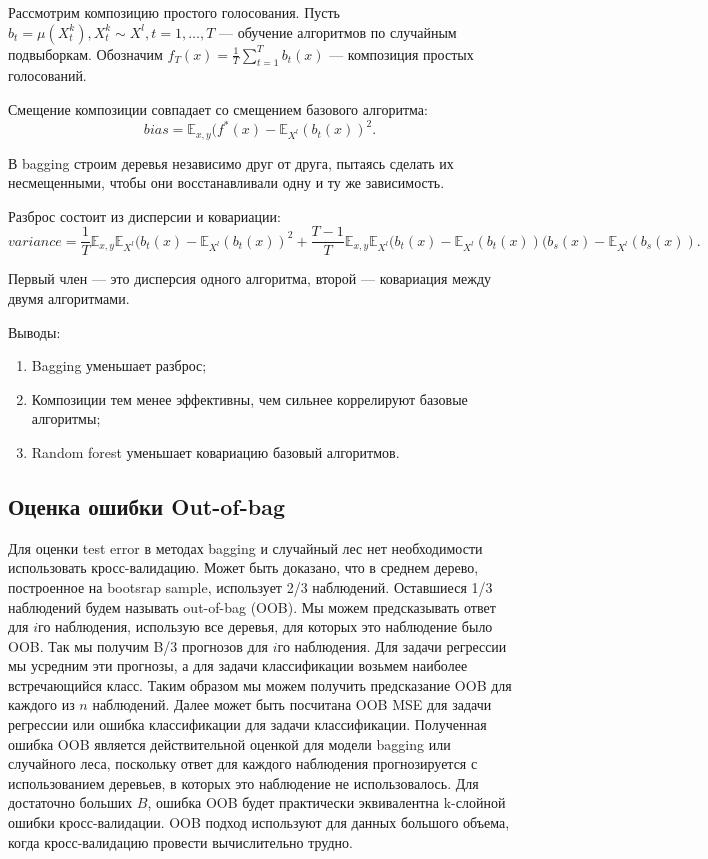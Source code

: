 \documentclass[14pt, a4paper]{article}
\begin{document}
Рассмотрим композицию простого голосования. Пусть $b_t = \mu(X_t^k), X_t^k \sim X^l, t = 1, \ldots, T$ --- обучение алгоритмов по случайным подвыборкам. Обозначим $f_T(x) = \frac{1}{T}\sum_{t=1}^T b_t(x)$ --- композиция простых голосований.

Смещение композиции совпадает со смещением базового алгоритма:
\begin{equation*}
bias = \mathbb{E}_{x,y} (f^{*}(x) -  \mathbb{E}_{X^l}(b_t(x))^2.
\end{equation*}

В bagging строим деревья независимо друг от друга, пытаясь сделать их несмещенными, чтобы они восстанавливали одну и ту же зависимость.

Разброс состоит из дисперсии и ковариации:
\begin{equation*}
variance = \frac{1}{T}\mathbb{E}_{x,y}\mathbb{E}_{X^l}(b_t(x) - \mathbb{E}_{X^l}(b_t(x))^2 + \frac{T-1}{T} \mathbb{E}_{x,y}\mathbb{E}_{X^l}(b_t(x) - \mathbb{E}_{X^l}(b_t(x))(b_s(x) - \mathbb{E}_{X^l}(b_s(x)).
\end{equation*}

Первый член --- это дисперсия одного алгоритма, второй --- ковариация между двумя алгоритмами. 

Выводы:
\begin{enumerate}
\item Bagging уменьшает разброс;
\item Композиции тем менее эффективны, чем сильнее коррелируют базовые алгоритмы;
\item Random forest уменьшает ковариацию базовый алгоритмов.
\end{enumerate}

\subsection{Оценка ошибки Out-of-bag}

Для оценки test error в методах bagging и случайный лес нет необходимости использовать кросс-валидацию. Может быть доказано, что в среднем дерево, построенное на bootsrap sample, использует 2/3 наблюдений. Оставшиеся 1/3 наблюдений будем называть out-of-bag (OOB). Мы можем предсказывать ответ для $i$го наблюдения, использую все деревья, для которых это наблюдение было OOB. Так мы получим B/3 прогнозов для $i$го наблюдения. Для задачи регрессии мы усредним эти прогнозы, а для задачи классификации возьмем наиболее встречающийся класс. Таким образом мы можем получить предсказание OOB для каждого из $n$ наблюдений. Далее может быть посчитана OOB MSE для задачи регрессии или ошибка классификации для задачи классификации. Полученная ошибка OOB является действительной оценкой для модели bagging или случайного леса, поскольку ответ для каждого наблюдения прогнозируется с использованием деревьев, в которых это наблюдение не использовалось. Для достаточно больших $B$, ошибка OOB будет практически эквивалентна k-слойной ошибки кросс-валидации. OOB подход используют для данных большого объема, когда кросс-валидацию провести вычислительно трудно.
\end{document}
